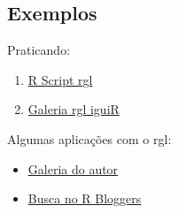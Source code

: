 
\subsection{Exemplos}

\begin{frame}

  Praticando:
  \begin{enumerate}
  \item \href{run:./R/rgl/rgl.R}{R Script rgl}
  \item \href{run:./rgl/RGL.html}{Galeria rgl iguiR}
  \end{enumerate}

  \vspace{0.5cm}
  Algumas aplicações com o rgl:
  \begin{itemize}
  \item \href{http://cran.r-project.org/web/packages/rgl/vignettes/}{Galeria
      do autor}
  \item \href{http://www.r-bloggers.com/?s=rgl}{Busca no R Bloggers}
  \end{itemize}

\end{frame}
